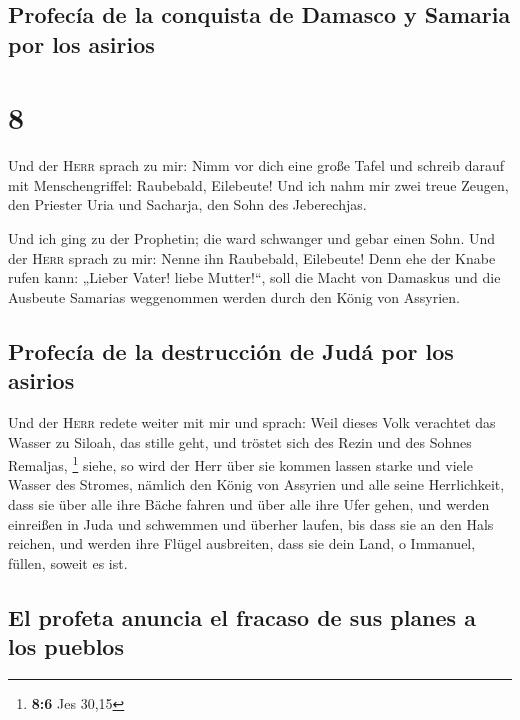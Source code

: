 \hypertarget{profecuxeda-de-la-conquista-de-damasco-y-samaria-por-los-asirios}{%
\subsection{Profecía de la conquista de Damasco y Samaria por los
asirios}\label{profecuxeda-de-la-conquista-de-damasco-y-samaria-por-los-asirios}}

\hypertarget{section-7}{%
\section{8}\label{section-7}}

 Und der \textsc{Herr} sprach zu mir: Nimm vor dich eine
große Tafel und schreib darauf mit Menschengriffel: Raubebald,
Eilebeute!  Und ich nahm mir zwei treue Zeugen, den
Priester Uria und Sacharja, den Sohn des Jeberechjas.

 Und ich ging zu der Prophetin; die ward schwanger und
gebar einen Sohn. Und der \textsc{Herr} sprach zu mir: Nenne ihn
Raubebald, Eilebeute!  Denn ehe der Knabe rufen kann:
„Lieber Vater! liebe Mutter!{}``, soll die Macht von Damaskus und die
Ausbeute Samarias weggenommen werden durch den König von Assyrien.

\hypertarget{profecuxeda-de-la-destrucciuxf3n-de-juduxe1-por-los-asirios}{%
\subsection{Profecía de la destrucción de Judá por los
asirios}\label{profecuxeda-de-la-destrucciuxf3n-de-juduxe1-por-los-asirios}}

 Und der \textsc{Herr} redete weiter mit mir und sprach:
 Weil dieses Volk verachtet das Wasser zu Siloah, das
stille geht, und tröstet sich des Rezin und des Sohnes Remaljas,
\footnote{\textbf{8:6} Jes 30,15}  siehe, so wird der Herr
über sie kommen lassen starke und viele Wasser des Stromes, nämlich den
König von Assyrien und alle seine Herrlichkeit, dass sie über alle ihre
Bäche fahren und über alle ihre Ufer gehen,  und werden
einreißen in Juda und schwemmen und überher laufen, bis dass sie an den
Hals reichen, und werden ihre Flügel ausbreiten, dass sie dein Land, o
Immanuel, füllen, soweit es ist.

\hypertarget{el-profeta-anuncia-el-fracaso-de-sus-planes-a-los-pueblos}{%
\subsection{El profeta anuncia el fracaso de sus planes a los
pueblos}\label{el-profeta-anuncia-el-fracaso-de-sus-planes-a-los-pueblos}}

